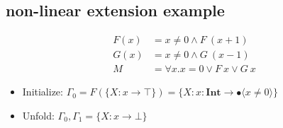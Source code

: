 \documentclass[runningheads]{llncs}
\newcommand\COL{\mathbin{:}}
\newcommand \stypeint {\textbf{Int}}
\newcommand \stypebool {\bullet}
\newcommand \typeint[1]{{#1} : \stypeint}
\newcommand \typebool[1]{\stypebool \langle #1 \rangle}
\begin{document}
\subsection{non-linear extension example}

\begin{align*}
    F(x) &= x \neq 0 \wedge F\ (x+1) \\
    G(x) &= x \neq 0 \wedge G\ (x-1)  \\
    M    &= \forall x. x=0 \lor F\ x \lor G\ x
\end{align*}

\begin{itemize}
    \item Initialize: \(\Gamma_0 = F(\{X \COL x \rightarrow \top\}) = \{ X \COL
        \typeint{x} \to \typebool{x \neq 0} \} \)
    \item Unfold: \(\Gamma_0, \Gamma_1 = \{X \COL x \rightarrow \bot\}\)
\end{itemize}
\end{document}
